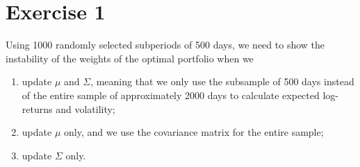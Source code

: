 
\section*{Exercise 1}

Using 1000 randomly selected subperiods of 500 days, we need to show the instability of the weights of the optimal portfolio when we
\begin{enumerate}
\item update $\mu$ and $\Sigma$, meaning that we only use the subsample of 500 days instead of the entire sample of approximately 2000 days to calculate expected log-returns and volatility; 
\item update $\mu$ only, and we use the covariance matrix for the entire sample;
\item update $\Sigma$ only.
\end{enumerate}

